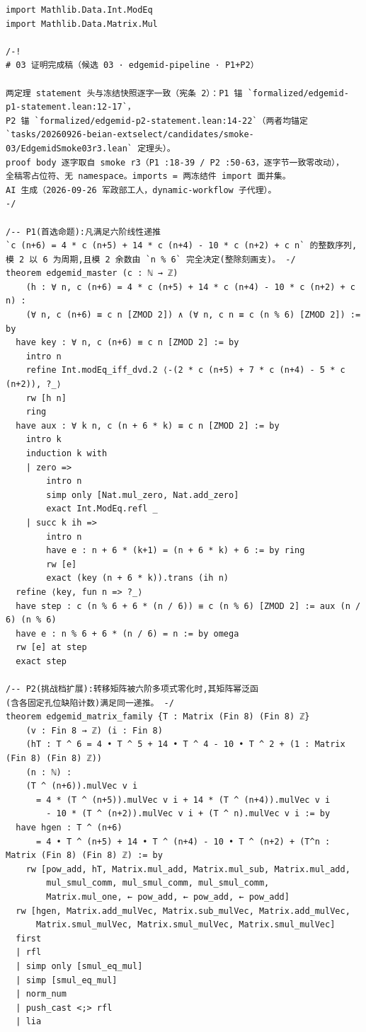 \documentclass[11pt]{article}
\begin{document}
\begin{lstlisting}[caption={Complete frozen final development (verbatim full text, lines 1--66 of \texttt{final/03-proof-complete.lean}, sha256 \texttt{1124e6a5...72c1d}). The two theorem headers (lines 15--20, 44--52) are byte-identical to the frozen statement files; docstrings and the header comment are in Chinese as frozen.},label={lst:full}]
import Mathlib.Data.Int.ModEq
import Mathlib.Data.Matrix.Mul

/-!
# 03 证明完成稿（候选 03 · edgemid-pipeline · P1+P2）

两定理 statement 头与冻结快照逐字一致（宪条 2）：P1 锚 `formalized/edgemid-p1-statement.lean:12-17`，
P2 锚 `formalized/edgemid-p2-statement.lean:14-22`（两者均锚定
`tasks/20260926-beian-extselect/candidates/smoke-03/EdgemidSmoke03r3.lean` 定理头）。
proof body 逐字取自 smoke r3（P1 :18-39 / P2 :50-63，逐字节一致零改动），
全稿零占位符、无 namespace。imports = 两冻结件 import 面并集。
AI 生成（2026-09-26 军政部工人，dynamic-workflow 子代理）。
-/

/-- P1(首选命题):凡满足六阶线性递推
`c (n+6) = 4 * c (n+5) + 14 * c (n+4) - 10 * c (n+2) + c n` 的整数序列,
模 2 以 6 为周期,且模 2 余数由 `n % 6` 完全决定(整除刻画支)。 -/
theorem edgemid_master (c : ℕ → ℤ)
    (h : ∀ n, c (n+6) = 4 * c (n+5) + 14 * c (n+4) - 10 * c (n+2) + c n) :
    (∀ n, c (n+6) ≡ c n [ZMOD 2]) ∧ (∀ n, c n ≡ c (n % 6) [ZMOD 2]) := by
  have key : ∀ n, c (n+6) ≡ c n [ZMOD 2] := by
    intro n
    refine Int.modEq_iff_dvd.2 ⟨-(2 * c (n+5) + 7 * c (n+4) - 5 * c (n+2)), ?_⟩
    rw [h n]
    ring
  have aux : ∀ k n, c (n + 6 * k) ≡ c n [ZMOD 2] := by
    intro k
    induction k with
    | zero =>
        intro n
        simp only [Nat.mul_zero, Nat.add_zero]
        exact Int.ModEq.refl _
    | succ k ih =>
        intro n
        have e : n + 6 * (k+1) = (n + 6 * k) + 6 := by ring
        rw [e]
        exact (key (n + 6 * k)).trans (ih n)
  refine ⟨key, fun n => ?_⟩
  have step : c (n % 6 + 6 * (n / 6)) ≡ c (n % 6) [ZMOD 2] := aux (n / 6) (n % 6)
  have e : n % 6 + 6 * (n / 6) = n := by omega
  rw [e] at step
  exact step

/-- P2(挑战档扩展):转移矩阵被六阶多项式零化时,其矩阵幂泛函
(含各固定孔位缺陷计数)满足同一递推。 -/
theorem edgemid_matrix_family {T : Matrix (Fin 8) (Fin 8) ℤ}
    (v : Fin 8 → ℤ) (i : Fin 8)
    (hT : T ^ 6 = 4 • T ^ 5 + 14 • T ^ 4 - 10 • T ^ 2 + (1 : Matrix (Fin 8) (Fin 8) ℤ))
    (n : ℕ) :
    (T ^ (n+6)).mulVec v i
      = 4 * (T ^ (n+5)).mulVec v i + 14 * (T ^ (n+4)).mulVec v i
        - 10 * (T ^ (n+2)).mulVec v i + (T ^ n).mulVec v i := by
  have hgen : T ^ (n+6)
      = 4 • T ^ (n+5) + 14 • T ^ (n+4) - 10 • T ^ (n+2) + (T^n : Matrix (Fin 8) (Fin 8) ℤ) := by
    rw [pow_add, hT, Matrix.mul_add, Matrix.mul_sub, Matrix.mul_add,
        mul_smul_comm, mul_smul_comm, mul_smul_comm,
        Matrix.mul_one, ← pow_add, ← pow_add, ← pow_add]
  rw [hgen, Matrix.add_mulVec, Matrix.sub_mulVec, Matrix.add_mulVec,
      Matrix.smul_mulVec, Matrix.smul_mulVec, Matrix.smul_mulVec]
  first
  | rfl
  | simp only [smul_eq_mul]
  | simp [smul_eq_mul]
  | norm_num
  | push_cast <;> rfl
  | lia
\end{lstlisting}
\end{document}
